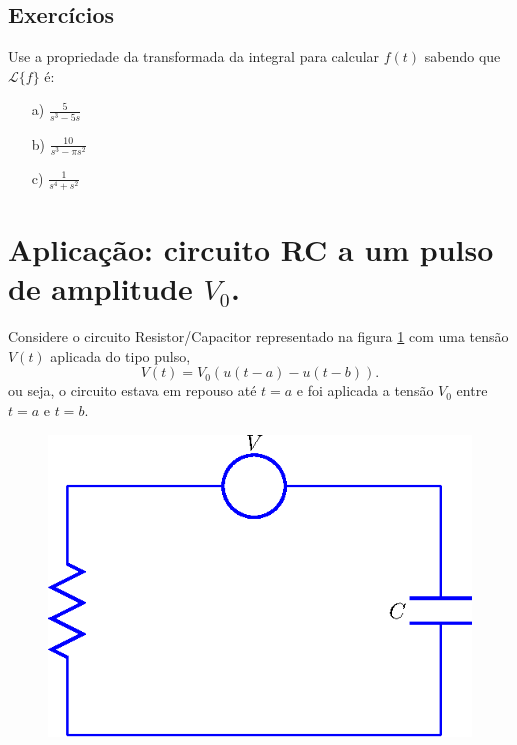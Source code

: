 \subsection*{Exercícios}
\begin{exer}
Use a propriedade da transformada da integral para calcular $f(t)$ sabendo que $\mathcal{L}\{f \} $ é:
\begin{itemize}
  \item[a)] $\displaystyle \frac{5}{s^3 - 5s}$
  \item[b)] $\displaystyle \frac{10}{s^3 - \pi s^2}$
  \item[c)] $\displaystyle \frac{1}{s^4 + s^2}$
\end{itemize}
\end{exer}

\section{Aplicação: circuito RC a um pulso de amplitude $V_0$.}{\label{sec_circ}}
Considere o circuito Resistor/Capacitor representado na figura \ref{fig_circ} com uma tensão $V(t)$ aplicada do tipo pulso,
\begin{equation}
V(t)=V_0\left(u(t-a)-u(t-b)\right).
\end{equation}
ou seja, o circuito estava em repouso até $t=a$ e foi aplicada a tensão $V_0$ entre $t=a$ e $t=b$.
\begin{figure}[!ht]
\begin{center}

\includegraphics{cap_trans_int/pics/figura_10}\end{center}
\caption{\label{fig_circ}}
\end{figure}
